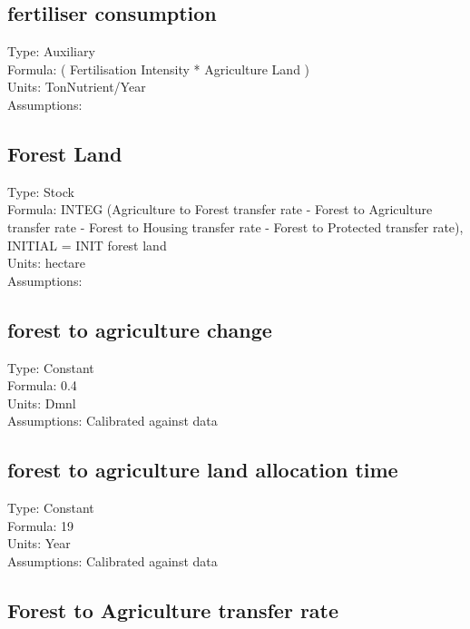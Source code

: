 \documentclass[
  11pt,
]{book}
\begin{document}
\hypertarget{fertiliser-consumption}{%
\subsection{fertiliser consumption}\label{fertiliser-consumption}}

Type: Auxiliary\\
Formula: ( Fertilisation Intensity * Agriculture Land )\\
Units: TonNutrient/Year\\
Assumptions:

\hypertarget{forest-land}{%
\subsection{Forest Land}\label{forest-land}}

Type: Stock\\
Formula: INTEG (Agriculture to Forest transfer rate - Forest to Agriculture transfer rate - Forest to Housing transfer rate - Forest to Protected transfer rate), INITIAL = INIT forest land\\
Units: hectare\\
Assumptions:

\hypertarget{forest-to-agriculture-change}{%
\subsection{forest to agriculture change}\label{forest-to-agriculture-change}}

Type: Constant\\
Formula: 0.4\\
Units: Dmnl\\
Assumptions: Calibrated against data

\hypertarget{forest-to-agriculture-land-allocation-time}{%
\subsection{forest to agriculture land allocation time}\label{forest-to-agriculture-land-allocation-time}}

Type: Constant\\
Formula: 19\\
Units: Year\\
Assumptions: Calibrated against data

\hypertarget{forest-to-agriculture-transfer-rate}{%
\subsection{Forest to Agriculture transfer rate}\label{forest-to-agriculture-transfer-rate}}
\end{document}
